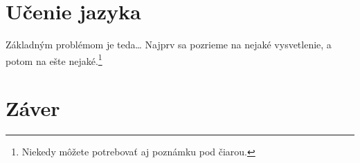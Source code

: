 \documentclass[10pt,twoside,slovak,a4paper]{article}
\begin{document}
\section{Učenie jazyka} \label{ucenie_jazyka}

Základným problémom je teda\ldots{} Najprv sa pozrieme na nejaké vysvetlenie, 
a potom na ešte nejaké.\footnote{Niekedy môžete potrebovať aj poznámku pod čiarou.}


\section{Záver} \label{zaver} %




 
\end{document}
